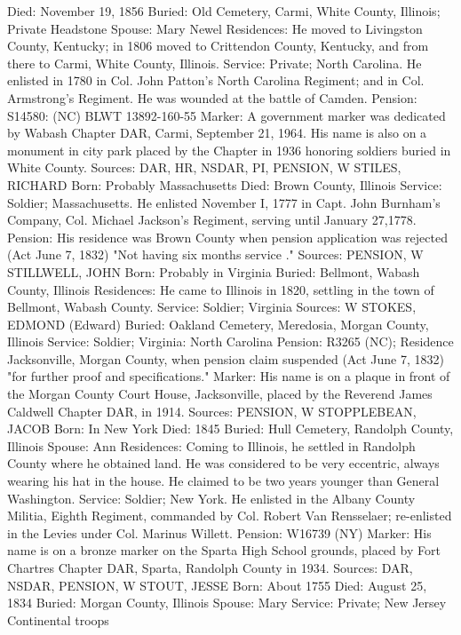 Died: November 19, 1856 
Buried: Old Cemetery, Carmi, White County, Illinois; Private Headstone 
Spouse: Mary Newel 
Residences: He moved to Livingston County, Kentucky; in 1806 moved to Crit­tendon County, Kentucky, and from there to Carmi, White County, Illinois.
Service: Private; North Carolina. He enlisted in 1780 in Col. John Patton's North Carolina Regiment; and in Col. Armstrong's Regiment. He was wounded at the battle of Camden.
Pension: S14580: (NC) BLWT 13892-160-55
Marker: A government marker was dedicated by Wabash Chapter DAR, Carmi, September 21, 1964. His name is also on a monument in city park placed by the Chapter in 1936 honoring soldiers buried in White County.
Sources: DAR, HR, NSDAR, PI, PENSION, W 
STILES, RICHARD
Born: Probably Massachusetts 
Died: Brown County, Illinois 
Service: Soldier; Massachusetts. He enlisted November I, 1777 in Capt. John Burnham's Company, Col. Michael Jackson's Regiment, serving until Jan­uary 27,1778. 
Pension: His residence was Brown County when pension application was rejected (Act June 7, 1832) "Not having six months service ."
Sources: PENSION, W 
STILLWELL, JOHN 
Born: Probably in Virginia
Buried: Bellmont, Wabash County, Illinois Residences: He came to Illinois in 1820, settling in the town of Bellmont, Wa­bash County.
Service: Soldier; Virginia
Sources: W 
STOKES, EDMOND (Edward)
Buried: Oakland Cemetery, Meredosia, Morgan County, Illinois
Service: Soldier; Virginia: North Carolina
Pension: R3265 (NC); Residence Jacksonville, Morgan County, when pension claim suspended (Act June 7, 1832) "for further proof and specifications."
Marker: His name is on a plaque in front of the Morgan County Court House, Jacksonville, placed by the Reverend James Caldwell Chapter DAR, in 1914.
Sources: PENSION, W 
STOPPLEBEAN, JACOB
Born: In New York
Died: 1845
Buried: Hull Cemetery, Randolph County, Illinois
Spouse: Ann 
Residences: Coming to Illinois, he settled in Randolph County where he obtained land. He was considered to be very eccentric, always wearing his hat in the house. He claimed to be two years younger than General Washington. 
Service: Soldier; New York. He enlisted in the Albany County Militia, Eighth Regiment, commanded by Col. Robert Van Rensselaer; re-enlisted in the Levies under Col. Marinus Willett. 
Pension: W16739 (NY)
Marker: His name is on a bronze marker on the Sparta High School grounds, placed by Fort Chartres Chapter DAR, Sparta, Randolph County in 1934.
Sources: DAR, NSDAR, PENSION, W 
STOUT, JESSE 
Born: About 1755
Died: August 25, 1834
Buried: Morgan County, Illinois Spouse: Mary
Service: Private; New Jersey Continental troops
